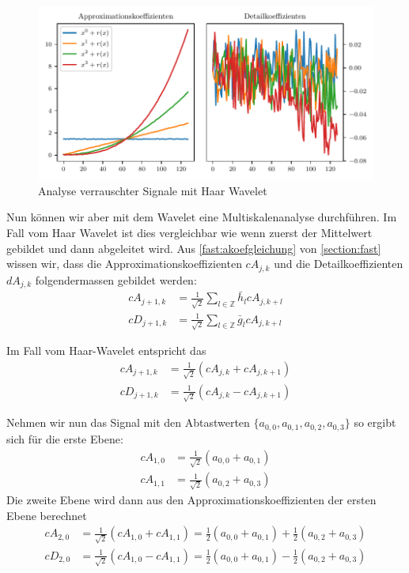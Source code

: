 \begin{refsection}
\begin{figure}
    \centering
    \includegraphics{papers/polynomials/images/polynomials_noise_db1.pdf}
    \caption{Analyse verrauschter Signale mit Haar Wavelet\label{polynomials:noise:db1}}
\end{figure}

Nun können wir aber mit dem Wavelet eine Multiskalenanalyse durchführen. Im
Fall vom Haar Wavelet ist dies vergleichbar wie wenn zuerst der Mittelwert
gebildet und dann abgeleitet wird. Aus \cref{fast:akoefgleichung} von
\cref{section:fast} wissen wir, dass die Approximationskoeffizienten $cA_{j,k}$
und die Detailkoeffizienten $dA_{j,k}$ folgendermassen gebildet werden:
\begin{align}
cA_{j+1,k}
&=
\frac{1}{\sqrt{2}} \sum_{l\in\mathbb Z} \bar{h}_l cA_{j,k+l}
\\
cD_{j+1,k}
&=
\frac{1}{\sqrt{2}} \sum_{l\in\mathbb Z} \bar{g}_l cA_{j,k+l}
\end{align}

Im Fall vom Haar-Wavelet entspricht das
\begin{align}
cA_{j+1,k}
&=
\frac{1}{\sqrt{2}} (cA_{j,k} + cA_{j,k+1})
\\
cD_{j+1,k}
&=
\frac{1}{\sqrt{2}} (cA_{j,k} - cA_{j,k+1})
\end{align}

Nehmen wir nun das Signal mit den Abtastwerten $\{a_{0,0}, a_{0,1}, a_{0,2}, a_{0,3}\}$ so ergibt
sich für die erste Ebene:
\begin{align}
cA_{1,0}
&=
\frac{1}{\sqrt{2}} (a_{0,0} + a_{0,1})
\\
cA_{1,1}
&=
\frac{1}{\sqrt{2}} (a_{0,2} + a_{0,3})
\end{align}
Die zweite Ebene wird dann aus den Approximationskoeffizienten der ersten Ebene berechnet
\begin{align}
cA_{2,0}
&=
\frac{1}{\sqrt{2}} (cA_{1,0} + cA_{1,1})
=
\frac{1}{2} (a_{0,0} + a_{0,1}) + \frac{1}{2} (a_{0,2} + a_{0,3})
\\
cD_{2,0}
&=
\frac{1}{\sqrt{2}} (cA_{1,0} - cA_{1,1})
=
\frac{1}{2} (a_{0,0} + a_{0,1}) - \frac{1}{2} (a_{0,2} + a_{0,3})
\end{align}


\end{refsection}
